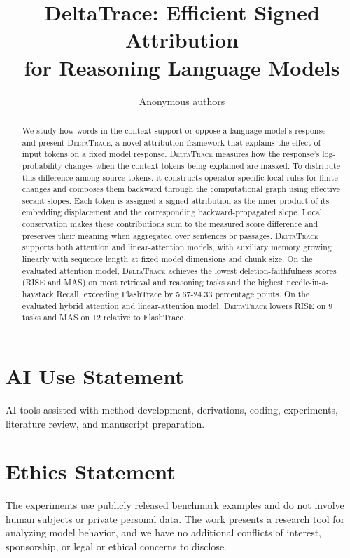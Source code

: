 \documentclass{article}
\title{DeltaTrace: Efficient Signed Attribution\\for Reasoning Language Models}
\author{Anonymous authors}
\newcommand{\dt}{\textsc{DeltaTrace}}
\begin{document}
\maketitle
\suppressfloats[t]
\begin{abstract}

We study how words in the context support or oppose a language model's response and present \dt{}, a novel attribution framework that explains the effect of input tokens on a fixed model response. \dt{} measures how the response's log-probability changes when the context tokens being explained are masked. To distribute this difference among source tokens, it constructs operator-specific local rules for finite changes and composes them backward through the computational graph using effective secant slopes. Each token is assigned a signed attribution as the inner product of its embedding displacement and the corresponding backward-propagated slope. Local conservation makes these contributions sum to the measured score difference and preserves their meaning when aggregated over sentences or passages. \dt{} supports both attention and linear-attention models, with auxiliary memory growing linearly with sequence length at fixed model dimensions and chunk size. On the evaluated attention model, \dt{} achieves the lowest deletion-faithfulness scores (RISE and MAS) on most retrieval and reasoning tasks and the highest needle-in-a-haystack Recall, exceeding FlashTrace by 5.67-24.33 percentage points. On the evaluated hybrid attention and linear-attention model, \dt{} lowers RISE on 9 tasks and MAS on 12 relative to FlashTrace.
\end{abstract}








\section*{AI Use Statement}
AI tools assisted with method development, derivations, coding, experiments, literature review, and manuscript preparation.

\section*{Ethics Statement}
The experiments use publicly released benchmark examples and do not involve human subjects or private personal data. The work presents a research tool for analyzing model behavior, and we have no additional conflicts of interest, sponsorship, or legal or ethical concerns to disclose.
\end{document}
